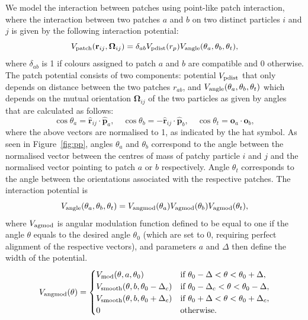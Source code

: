 We model the interaction between patches using point-like patch interaction, where the interaction between two patches $a$ and $b$ on two distinct particles $i$ and $j$ is given by the following interaction potential:
\begin{equation}
V_{\rm patch}(\mathbf{r}_{ij},\mathbf{\Omega}_{ij}) = \delta_{ab} V_{\rm pdist}(r_p) V_{\rm angle}(\theta_a, \theta_b, \theta_t), 
\end{equation}
 where $\delta_{ab}$ is 1 if colours assigned to patch $a$ and $b$ are compatible and 0 otherwise. The patch potential consists of two components: potential $V_{\rm pdist}$ that only depends on distance between the two patches $r_{ab}$, and $V_{\rm angle}(\theta_a, \theta_b, \theta_t)$ which depends on the mutual orientation $\mathbf{\Omega}_{ij}$ of the two particles as given by angles that are calculated as follows:
\begin{equation}
\cos \theta_a =  \mathbf{\hat{r}}_{ij} \cdot \mathbf{\hat{p}}_a, \quad \cos \theta_b =  \mathbf{-\hat{r}}_{ij} \cdot \mathbf{\hat{p}}_b, \quad 
\cos \theta_t =  \mathbf{o}_{a} \cdot \mathbf{o}_b,
\end{equation}
where the above vectors are normalised to 1, as indicated by the hat symbol. As seen in Figure~\ref{fig:pp}, angles $\theta_a$ and $\theta_b$ correspond to the angle between the normalised vector between the centres of mass of patchy particle $i$ and $j$ and the normalised vector pointing to patch $a$ or $b$ respectively. Angle $\theta_t$ corresponds to the angle between the orientations associated with the respective patches. The interaction potential is 
\begin{equation}
    V_{\rm angle}(\theta_a, \theta_b, \theta_t) = V_{\rm angmod}(\theta_a) V_{\rm agmod}(\theta_b)
    V_{\rm agmod}(\theta_t) ,
\end{equation}
where $V_{\rm agmod}$ is angular modulation function defined to be equal to one if the angle $\theta$ equals to the desired angle $\theta_0$ (which are set to $0$, requiring perfect alignment of the respective vectors), and parameters $a$ and  $\Delta$ then define the width of the potential.
\begin{equation}
V_{\rm angmod}(\theta) = \begin{cases}
	V_{\rm mod}(\theta, a, \theta_0)  & \text{if $ \theta_0 - \Delta < \theta < \theta_0 + \Delta  $},\\
	V_{\rm smooth} (\theta, b, \theta_0 - \Delta_c) & \text{if $\theta_0 - \Delta_c < \theta < \theta_0-\Delta $},\\
	V_{\rm smooth} (\theta, b, \theta_0 + \Delta_c) & \text{if $\theta_0 + \Delta < \theta < \theta_0+\Delta_c$},\\
	0 & \text{otherwise}.
	\end{cases} 
\end{equation}

